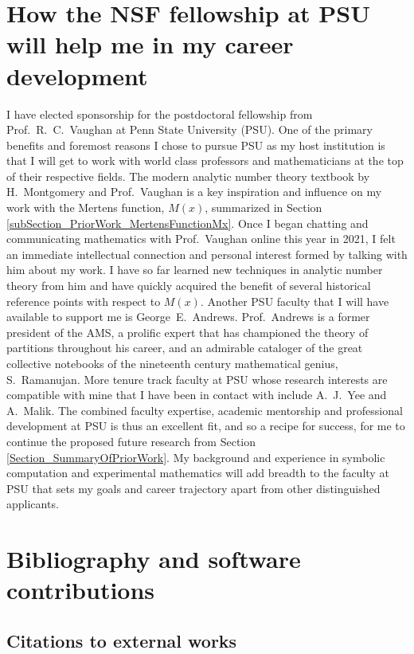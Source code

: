 \documentclass[10pt,reqno,letterpaper]{article}
\theoremstyle{plain}
\numberwithin{theorem}{section}
\theoremstyle{definition}
\renewcommand{\thesection}{\arabic{section}}
\begin{document}
\section{How the NSF fellowship at PSU will help me in my career development} 

I have elected sponsorship for 
the postdoctoral fellowship from Prof.~R.~C.~Vaughan at Penn State University (PSU). 
One of the primary benefits and foremost reasons I chose to pursue PSU as my host 
institution is that I will get to work with world class professors and mathematicians 
at the top of their respective fields. 
The modern analytic number theory textbook by H.~Montgomery and Prof.~Vaughan 
is a key inspiration and influence on my work with the Mertens function, $M(x)$, summarized in 
Section \ref{subSection_PriorWork_MertensFunctionMx}. 
Once I began chatting and communicating mathematics with Prof.~Vaughan online this year in 2021, 
I felt an immediate intellectual connection and personal interest formed by 
talking with him about my work. 
I have so far learned new techniques in analytic number theory from him and have quickly 
acquired the benefit of several historical reference points with respect to $M(x)$. 
Another PSU faculty that I will have available to support me is 
George~E.~Andrews. Prof.~Andrews is a former president of the AMS, 
a prolific expert that has championed the theory of partitions throughout his career, and 
an admirable cataloger of the great collective notebooks of the nineteenth century 
mathematical genius, S.~Ramanujan. 
More tenure track faculty at PSU whose research interests are compatible with mine 
that I have been in contact with include A.~J.~Yee and A.~Malik. 
The combined faculty expertise, academic mentorship and professional development 
at PSU is thus an excellent fit, and so a 
recipe for success, for me to continue the proposed future research 
from Section \ref{Section_SummaryOfPriorWork}. 
My background and experience in symbolic computation and 
experimental mathematics will add breadth to the faculty at 
PSU that sets my goals and career trajectory apart from other 
distinguished applicants.


\newpage 
\renewcommand{\thesection}{B}
\section{Bibliography and software contributions} 
\label{page_Section_BibliographyB} 

\subsection{Citations to external works}
\end{document}
